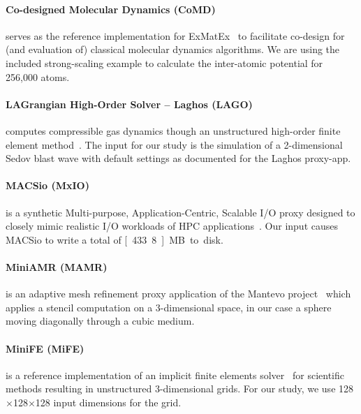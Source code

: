 \paragraph{Co-designed Molecular Dynamics (CoMD)} serves as the reference implementation for
ExMatEx~\cite{mohd-yusof_co-design_2013} to facilitate co-design for (and evaluation of) classical molecular
dynamics algorithms.
We are using the included strong-scaling example to calculate the inter-atomic potential for 256,000 atoms.

\paragraph{LAGrangian High-Order Solver -- Laghos (LAGO)} computes compressible gas dynamics though
an unstructured high-order finite element method~\cite{dobrev_high-order_2012}. The input for our study is the
simulation of a 2-dimensional Sedov blast wave with default settings as documented for the
Laghos proxy-app.

\paragraph{MACSio (MxIO)} is a synthetic Multi-purpose, Application-Centric,
Scalable I/O proxy designed to closely mimic realistic I/O workloads of
HPC applications~\cite{dickson_replicating_2016}. Our input causes MACSio to write a total of \unit[433.8]{MB} to disk.

\paragraph{MiniAMR (MAMR)} is an adaptive mesh refinement proxy application of the Mantevo
project~\cite{heroux_improving_2009} which applies a stencil computation on a 3-dimensional space,
in our case a sphere moving diagonally through a cubic medium.

\paragraph{MiniFE (MiFE)} is a reference implementation of an implicit finite elements
solver~\cite{heroux_improving_2009} for scientific methods resulting in unstructured 3-dimensional grids.
For our study, we use 128$\times$128$\times$128 input dimensions for the grid.


